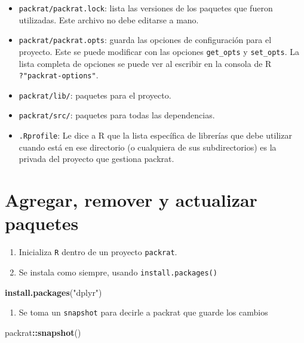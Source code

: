 \documentclass[]{article}
\newenvironment{Shaded}{\begin{snugshade}}{\end{snugshade}}
\newcommand{\KeywordTok}[1]{\textcolor[rgb]{0.13,0.29,0.53}{\textbf{#1}}}
\newcommand{\StringTok}[1]{\textcolor[rgb]{0.31,0.60,0.02}{#1}}
\newcommand{\OperatorTok}[1]{\textcolor[rgb]{0.81,0.36,0.00}{\textbf{#1}}}
\newcommand{\NormalTok}[1]{#1}
\providecommand{\tightlist}{%
  \setlength{\itemsep}{0pt}\setlength{\parskip}{0pt}}
\begin{document}
\begin{itemize}
\tightlist
\item
  \texttt{packrat/packrat.lock}: lista las versiones de los paquetes que
  fueron utilizadas. Este archivo no debe editarse a mano.
\item
  \texttt{packrat/packrat.opts}: guarda las opciones de configuración
  para el proyecto. Este se puede modificar con las opciones
  \texttt{get\_opts} y \texttt{set\_opts}. La lista completa de opciones
  se puede ver al escribir en la consola de R
  \texttt{?"packrat-options"}.
\item
  \texttt{packrat/lib/}: paquetes para el proyecto.
\item
  \texttt{packrat/src/}: paquetes para todas las dependencias.
\item
  \texttt{.Rprofile}: Le dice a R que la lista específica de librerías
  que debe utilizar cuando está en ese directorio (o cualquiera de sus
  subdirectorios) es la privada del proyecto que gestiona packrat.
\end{itemize}

\section{Agregar, remover y actualizar
paquetes}\label{agregar-remover-y-actualizar-paquetes}

\begin{enumerate}
\def\labelenumi{\arabic{enumi}.}
\tightlist
\item
  Inicializa \texttt{R} dentro de un proyecto \texttt{packrat}.
\item
  Se instala como siempre, usando \texttt{install.packages()}
\end{enumerate}

\begin{Shaded}
\begin{Highlighting}[]
\KeywordTok{install.packages}\NormalTok{(}\StringTok{"dplyr"}\NormalTok{)}
\end{Highlighting}
\end{Shaded}

\begin{enumerate}
\def\labelenumi{\arabic{enumi}.}
\setcounter{enumi}{2}
\tightlist
\item
  Se toma un \texttt{snapshot} para decirle a packrat que guarde los
  cambios
\end{enumerate}

\begin{Shaded}
\begin{Highlighting}[]
\NormalTok{packrat}\OperatorTok{::}\KeywordTok{snapshot}\NormalTok{()}
\end{Highlighting}
\end{Shaded}
\end{document}
